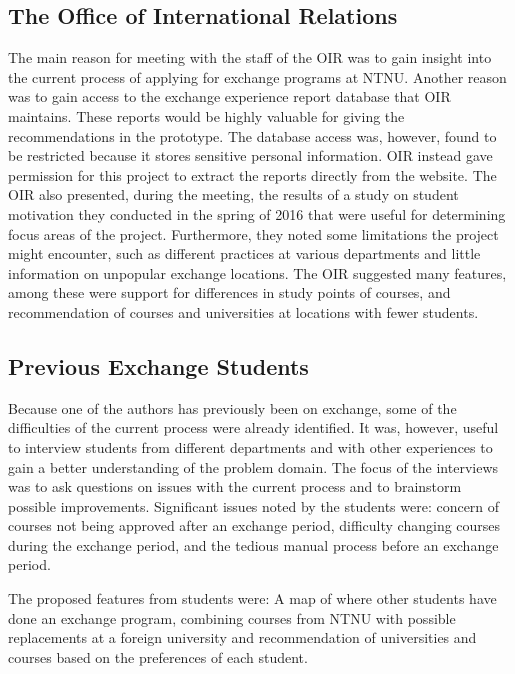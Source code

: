 \subsection{The Office of International Relations}

The main reason for meeting with the staff of the OIR was to gain insight into the current process of applying for exchange programs at NTNU. Another reason was to gain access to the exchange experience report database that OIR maintains. These reports would be highly valuable for giving the recommendations in the prototype. The database access was, however, found to be restricted because it stores sensitive personal information. OIR instead gave permission for this project to extract the reports directly from the website. The OIR also presented, during the meeting, the results of a study on student motivation they conducted in the spring of 2016 that were useful for determining focus areas of the project. Furthermore, they noted some limitations the project might encounter, such as different practices at various departments and little information on unpopular exchange locations. The OIR suggested many features, among these were support for differences in study points of courses, and recommendation of courses and universities at locations with fewer students.

\subsection{Previous Exchange Students}

Because one of the authors has previously been on exchange, some of the difficulties of the current process were already identified. It was, however, useful to interview students from different departments and with other experiences to gain a better understanding of the problem domain. The focus of the interviews was to ask questions on issues with the current process and to brainstorm possible improvements. Significant issues noted by the students were: concern of courses not being approved after an exchange period, difficulty changing courses during the exchange period, and the tedious manual process before an exchange period.

The proposed features from students were: A map of where other students have done an exchange program, combining courses from NTNU with possible replacements at a foreign university and recommendation of universities and courses based on the preferences of each student. 

